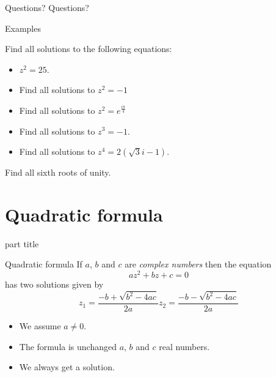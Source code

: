 \documentclass{beamer}
\begin{document}
\begin{frame}{Questions?}
Questions?
\end{frame}

\begin{frame}{Examples}
\begin{example}
Find all solutions to the following equations:
\begin{itemize}
	\item $z^2 = 25$. %
	\item Find all solutions to $z^2 = -1$ %
	\item Find all solutions to $z^2 = e^{\frac{i\pi}{4}}$ %
	\item Find all solutions to $z^3 = -1$.
	\item Find all solutions to $z^4 = 2(\sqrt{3}i-1)$. %
\end{itemize}
\end{example}
\begin{example}
Find all sixth roots of unity.
\end{example}
\end{frame}

\section{Quadratic formula}

\begin{frame}
\begin{beamercolorbox}[sep=12pt,center]{part title}
\insertsection\par
\end{beamercolorbox}
\end{frame}

\begin{frame}{Quadratic formula}
If $a$, $b$ and $c$ are \emph{complex numbers} then the equation
\begin{equation*}
az^2+bz+c = 0
\end{equation*}
has two solutions given by
\begin{equation*}
	z_1 = \frac{-b+\sqrt{b^2-4ac}}{2a} z_2 = \frac{-b-\sqrt{b^2-4ac}}{2a}
\end{equation*}
\begin{itemize}
	\item We assume $a\neq 0$.
	\item The formula is unchanged $a$, $b$ and $c$ real numbers.
	\item We always get a solution.
\end{itemize}
\end{frame}
\end{document}
